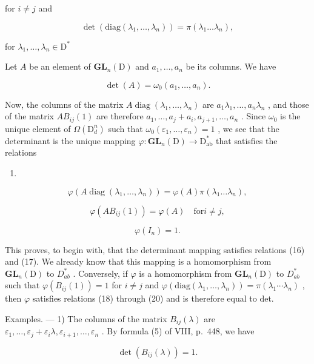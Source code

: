 for \(i\neq j\) and

\[
\det (\mathrm{diag} (\lambda_ {1}, \ldots , \lambda_ {n})) = \pi (\lambda_ {1} \dots \lambda_ {n}),\tag{17}
\]

for \(\lambda_1, \ldots, \lambda_n \in \mathrm{D}^*\)

Let \(A\) be an element of \(\mathbf{GL}_n(\mathrm{D})\) and \(a_1, \ldots, a_n\) be its columns. We have

\[
\det (A) = \omega_ {0} (a _ {1}, \dots , a _ {n}).
\]

Now, the columns of the matrix \(A \operatorname{diag}(\lambda_1, \ldots, \lambda_n)\) are \(a_1\lambda_1, \ldots, a_n\lambda_n\) , and those of the matrix \(AB_{ij}(1)\) are therefore \(a_1, \ldots, a_j + a_i, a_{j+1}, \ldots, a_n\) . Since \(\omega_0\) is the unique element of \(\Omega(\mathrm{D}_d^n)\) such that \(\omega_0(\varepsilon_1, \ldots, \varepsilon_n) = 1\) , we see that the determinant is the unique mapping \(\varphi: \mathbf{GL}_n(\mathrm{D}) \to \mathrm{D}_{\mathrm{ab}}^*\) that satisfies the relations

\begin{enumerate}
\def\labelenumi{(\arabic{enumi})}
\setcounter{enumi}{17}
\tightlist
\item
\end{enumerate}

\[
\varphi (A \operatorname{diag} (\lambda_ {1}, \ldots , \lambda_ {n})) = \varphi (A) \pi (\lambda_ {1} \dots \lambda_ {n}),\tag{19}
\]

\[
\varphi (A B _ {i j} (1)) = \varphi (A) \quad \mathrm{for} i \neq j,\tag{20}
\]

\[
\varphi (I _ {n}) = 1.
\]

This proves, to begin with, that the determinant mapping satisfies relations (16) and (17). We already know that this mapping is a homomorphism from \(\mathbf{GL}_{n}(\mathrm{D})\) to \(D_{ab}^{*}\) . Conversely, if \(\varphi\) is a homomorphism from \(\mathbf{GL}_{n}(\mathrm{D})\) to \(D_{ab}^{*}\) such that \(\varphi(B_{ij}(1)) = 1\) for \(i \neq j\) and \(\varphi(\text{diag}(\lambda_1, \ldots, \lambda_n)) = \pi(\lambda_1 \cdots \lambda_n)\) , then \(\varphi\) satisfies relations (18) through (20) and is therefore equal to det.

Examples. --- 1) The columns of the matrix \(B_{ij}(\lambda)\) are \(\varepsilon_1, \ldots, \varepsilon_j + \varepsilon_i \lambda, \varepsilon_{i+1}, \ldots, \varepsilon_n\) . By formula (5) of VIII, p.~448, we have

\[
\det (B _ {i j} (\lambda)) = 1.\tag{21}
\]

